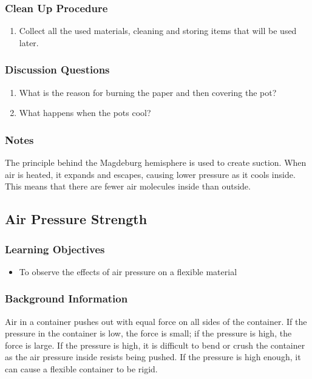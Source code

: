 \subsubsection*{Clean Up Procedure}
\begin{enumerate}
\item{Collect all the used materials, cleaning and storing items that will be used later.} 
\end{enumerate}

\subsubsection*{Discussion Questions}
\begin{enumerate}
\item{What is the reason for burning the paper and then covering the pot?}
\item{What happens when the pots cool?}
\end{enumerate}

\subsubsection*{Notes}
The principle behind the Magdeburg hemisphere is used to create suction. When air is heated, it expands and escapes, causing lower pressure as it cools inside. This means that there are fewer air molecules inside than outside. 

\subsection{Air Pressure Strength}

\subsubsection*{Learning Objectives}
\begin{itemize}
\item{To observe the effects of air pressure on a flexible material}
\end{itemize}

\subsubsection*{Background Information}
Air in a container pushes out with equal force on all sides of the container.  If the pressure in the container is low, the force is small; if the pressure is high, the force is large.  If the pressure is high, it is difficult to bend or crush the container as the air pressure inside resists being pushed.  If the pressure is high enough, it can cause a flexible container to be rigid.

